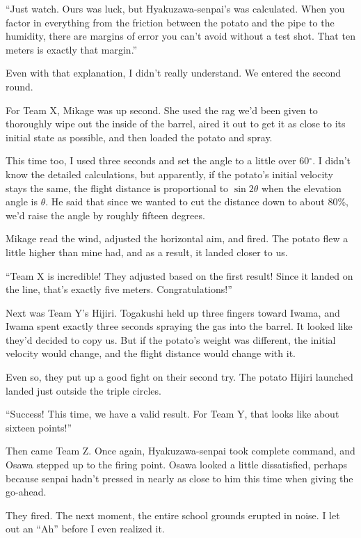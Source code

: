 \documentclass[
    a4paper,
    12pt,
    twoside,
    openany,
    UTF8,
    fontset=windows
]{ctexbook}
\begin{document}
``Just watch. Ours was luck, but Hyakuzawa-senpai's was calculated. When you factor in everything from the friction between the potato and the pipe to the humidity, there are margins of error you can't avoid without a test shot. That ten meters is exactly that margin.''

Even with that explanation, I didn't really understand. We entered the second round.

For Team X, Mikage was up second. She used the rag we'd been given to thoroughly wipe out the inside of the barrel, aired it out to get it as close to its initial state as possible, and then loaded the potato and spray.

This time too, I used three seconds and set the angle to a little over 60$^\circ$. I didn't know the detailed calculations, but apparently, if the potato's initial velocity stays the same, the flight distance is proportional to $\sin 2\theta$ when the elevation angle is $\theta$. He said that since we wanted to cut the distance down to about 80\%, we'd raise the angle by roughly fifteen degrees.

Mikage read the wind, adjusted the horizontal aim, and fired. The potato flew a little higher than mine had, and as a result, it landed closer to us.

``Team X is incredible! They adjusted based on the first result! Since it landed on the line, that's exactly five meters. Congratulations!''

Next was Team Y's Hijiri. Togakushi held up three fingers toward Iwama, and Iwama spent exactly three seconds spraying the gas into the barrel. It looked like they'd decided to copy us. But if the potato's weight was different, the initial velocity would change, and the flight distance would change with it.

Even so, they put up a good fight on their second try. The potato Hijiri launched landed just outside the triple circles.

``Success! This time, we have a valid result. For Team Y, that looks like about sixteen points!''

Then came Team Z. Once again, Hyakuzawa-senpai took complete command, and Osawa stepped up to the firing point. Osawa looked a little dissatisfied, perhaps because senpai hadn't pressed in nearly as close to him this time when giving the go-ahead.

They fired. The next moment, the entire school grounds erupted in noise. I let out an ``Ah'' before I even realized it.
\end{document}
